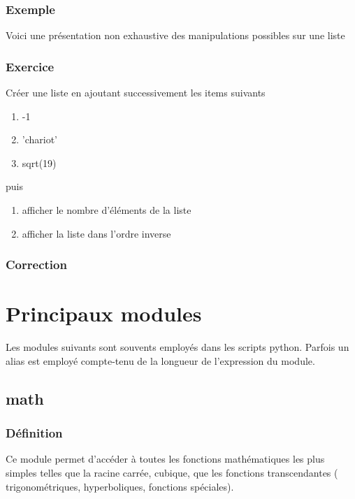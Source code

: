 \documentclass[a4paper,12pt]{article}
\begin{document}
\subsubsection{Exemple}
Voici une présentation non exhaustive des manipulations possibles sur une liste 


\subsubsection{Exercice}
\begin{leftbar}
Créer une liste en ajoutant successivement les items suivants
\begin{enumerate}
\item -1
\item 'chariot'
\item sqrt(19)
\end{enumerate}
puis
\begin{enumerate}
\item afficher le nombre d'éléments de la liste 
\item afficher la liste dans l'ordre inverse
\end{enumerate}
\end{leftbar}
\subsubsection{Correction}




\clearpage
\section{Principaux modules}

Les modules suivants sont souvents employ\'es dans les scripts python. Parfois un alias est employ\'e compte-tenu de la longueur de l'expression du module.

\subsection{math}
\subsubsection{Définition}
\begin{leftbar}
Ce module permet d'accéder à toutes les fonctions mathématiques les plus simples telles que la racine carrée, cubique, que les fonctions transcendantes ( trigonométriques, hyperboliques, fonctions spéciales).
\end{leftbar}
\end{document}
